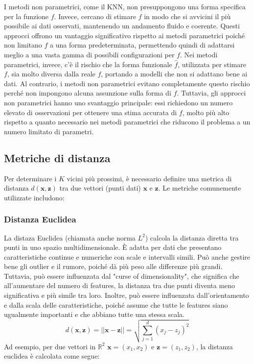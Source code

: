 I metodi non parametrici, come il KNN, non presuppongono una forma 
specifica per la funzione \( f \). Invece, cercano di stimare \( f \) 
in modo che si avvicini il più possibile ai dati osservati, mantenendo 
un andamento fluido e coerente. Questi approcci offrono un vantaggio 
significativo rispetto ai metodi parametrici poiché non limitano \( f \) 
a una forma predeterminata, permettendo quindi di adattarsi meglio a una 
vasta gamma di possibili configurazioni per \( f \). Nei metodi parametrici, 
invece, c'è il rischio che la forma funzionale $\hat{f}$, utilizzata per stimare \( f \), 
sia molto diversa dalla reale \( f \), portando a modelli che non si adattano 
bene ai dati. Al contrario, i metodi non parametrici evitano completamente 
questo rischio perché non impongono alcuna assunzione sulla forma di \( f \). 
Tuttavia, gli approcci non parametrici hanno uno svantaggio principale: 
essi richiedono un numero elevato di osservazioni per ottenere una stima 
accurata di \( f \), molto più alto rispetto a quanto necessario nei metodi 
parametrici che riducono il problema a un numero limitato di parametri.

\subsection{Metriche di distanza}

Per determinare i \( K \) vicini più prossimi, è necessario definire 
una metrica di distanza \( d(\mathbf{x}, \mathbf{z}) \) tra due vettori (punti dati) 
\( \mathbf{x} \) e \( \mathbf{z} \). Le metriche comunemente utilizzate includono:

\subsubsection{Distanza Euclidea} 
La distaza Euclidea (chiamata anche norma $L^2$) calcola la distanza diretta tra punti in uno spazio multidimensionale. 
È adatta per dati 
che presentano caratteristiche continue e numeriche con scale e intervalli simili. 
Può anche gestire bene gli outlier e il rumore, poiché dà più peso alle differenze più grandi. 
Tuttavia, può essere influenzata dal "curse of dimensionality", che significa che all'aumentare 
del numero di features, la distanza tra due punti diventa meno significativa e più simile tra loro.
Inoltre, può essere influenzata dall'orientamento e dalla scala delle 
    caratteristiche, poiché assume che tutte le features siano ugualmente 
    importanti e che abbiano tutte una stessa scala.
    \[
    d(\mathbf{x}, \mathbf{z}) = ||\mathbf{x} - \mathbf{z}|| = \sqrt{\sum_{j=1}^d (x_j - z_j)^2}
    \]
Ad esempio, per due vettori in \( \mathbb{R}^2 \) \(\mathbf{x} = (x_1, x_2)\) e \(\mathbf{z} = (z_1, z_2)\), la distanza euclidea è calcolata come segue:

